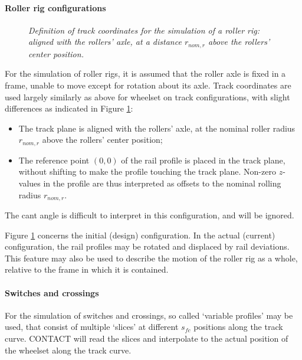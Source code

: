 \documentclass[12pt]{report}
\begin{document}
\paragraph{Roller rig configurations}

\begin{figure}[bt]
\centering
{}
\caption{\em Definition of track coordinates for the simulation of a roller
        rig: aligned with the rollers' axle, at a distance $r_{nom,r}$ above
        the rollers' center position.}
\label{fig:rollerrig_coord}
\end{figure}

For the simulation of roller rigs, it is assumed that the roller axle is
fixed in a frame, unable to move except for rotation about its axle. Track
coordinates are used largely similarly as above for wheelset on track
configurations, with slight differences as indicated in Figure
\ref{fig:rollerrig_coord}:
\begin{itemize}
\item The track plane is aligned with the rollers' axle, at the nominal
        roller radius $r_{nom,r}$ above the rollers' center position;
\item The reference point $(0,0)$ of the rail profile is placed in the
        track plane, without shifting to make the profile touching the
        track plane. Non-zero $z$-values in the profile are thus
        interpreted as offsets to the nominal rolling radius $r_{nom,r}$.
\end{itemize}
The cant angle is difficult to interpret in this configuration, and will be
ignored.

Figure \ref{fig:rollerrig_coord} concerns the initial (design)
configuration. In the actual (current) configuration, the rail profiles
may be rotated and displaced by rail deviations. This feature may also be
used to describe the motion of the roller rig as a whole, relative to the
frame in which it is contained.

\paragraph{Switches and crossings}

For the simulation of switches and crossings, so called `variable profiles'
may be used, that consist of multiple `slices' at different $s_{fc}$
positions along the track curve. CONTACT will read the slices and
interpolate to the actual position of the wheelset along the track curve.
\end{document}
